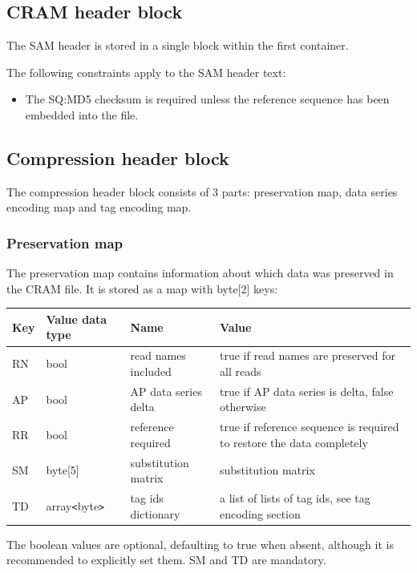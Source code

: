 \documentclass[a4paper]{article}
\begin{document}
\subsection{\textbf{CRAM header block}}

The SAM header is stored in a single block within the first container. 

The following constraints apply to the SAM header text: 

\begin{itemize}
\item The SQ:MD5 checksum is required unless the reference sequence has been embedded 
into the file.
\end{itemize}

\subsection{\textbf{Compression header block}}
\label{subsec:compression-header}

The compression header block consists of 3 parts: preservation map, data series 
encoding map and tag encoding map.

\subsubsection*{Preservation map}

The preservation map contains information about which data was preserved in the 
CRAM file. It is stored as a map with byte[2] keys:

\begin{tabular}{|l|l|>{\raggedright}p{100pt}|>{\raggedright}p{220pt}|}
\hline
\textbf{Key} & \textbf{Value data type} & \textbf{Name} & \textbf{Value}\tabularnewline
\hline
RN & bool & read names included & true if read names are preserved for all reads\tabularnewline
\hline
AP & bool & AP data series delta & true if AP data series is delta, false otherwise\tabularnewline
\hline
RR & bool & reference required & true if reference sequence is required to restore 
the data completely\tabularnewline
\hline
SM & byte[5] & substitution matrix & substitution matrix\tabularnewline
\hline
TD & array\texttt{<}byte\texttt{>} & tag ids dictionary & a list of lists of tag ids, see tag encoding section\tabularnewline
\hline
\end{tabular}

The boolean values are optional, defaulting to true when absent, although it is recommended to explicitly set them.  SM and TD are mandatory.
\end{document}
